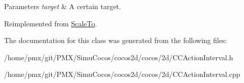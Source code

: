 \begin{DoxyParams}{Parameters}
{\em target} & A certain target. \\
\hline
\end{DoxyParams}


Reimplemented from \hyperlink{classScaleTo_a2591cf6fc3d966d7799bac46acce04d7}{Scale\+To}.



The documentation for this class was generated from the following files\+:\begin{DoxyCompactItemize}
\item 
/home/pmx/git/\+P\+M\+X/\+Simu\+Cocos/cocos2d/cocos/2d/C\+C\+Action\+Interval.\+h\item 
/home/pmx/git/\+P\+M\+X/\+Simu\+Cocos/cocos2d/cocos/2d/C\+C\+Action\+Interval.\+cpp\end{DoxyCompactItemize}
